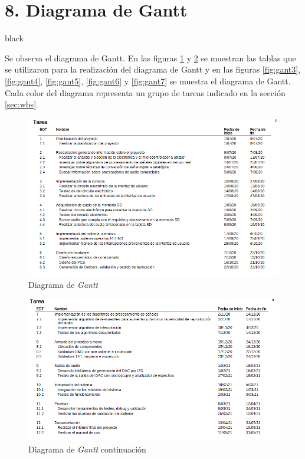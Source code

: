 \documentclass[11pt]{charter}
\begin{document}
\section{8. Diagrama de Gantt}
\label{sec:gantt}
\begin{consigna}{black}

Se observa el diagrama de Gantt. En las figuras \ref{fig:gant1} y \ref{fig:gant2} se muestran las tablas que se utilizaron para la realización del diagrama de Gantt y en las figuras \ref{fig:gant3}, \ref{fig:gant4}, \ref{fig:gant5}, \ref{fig:gant6} y \ref{fig:gant7} se muestra el diagrama de Gantt. Cada color del diagrama representa un grupo de tareas indicado en la sección \ref{sec:wbs}

\begin{figure}[H]
\centering 
\includegraphics[width=1.1\textwidth]{./Figuras/gant1.png}
\caption{Diagrama de \textit{Gantt}}
\label{fig:gant1}
\end{figure}

\begin{figure}[H]
\centering 
\includegraphics[width=1.1\textwidth]{./Figuras/gant2.png}
\caption{Diagrama de \textit{Gantt} continuación}
\label{fig:gant2}
\end{figure}


\end{consigna}
\end{document}
